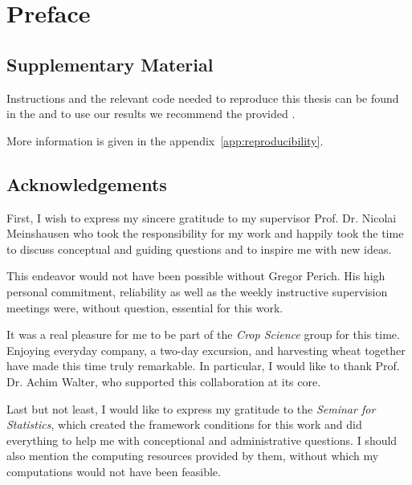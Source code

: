 \chapter*{Preface}

\section*{Supplementary Material}


Instructions and the relevant code needed to reproduce this thesis can be found in the \href{https://github.com/LGraz/MasterThesis-Code}{\color{blue}{GitHub repository}} and to use our results we recommend the provided \href{https://github.com/LGraz/CorrectTimeSeries }{\color{blue}{R-package}}.

More information is given in the appendix~\ref{app:reproducibility}.  


\section*{Acknowledgements}
First, I wish to express my sincere gratitude to my supervisor Prof. Dr. Nicolai Meinshausen who took the responsibility for my work and happily took the time to discuss conceptual and guiding questions and to inspire me with new ideas. 

This endeavor would not have been possible without Gregor Perich. His high personal commitment, reliability as well as the weekly instructive supervision meetings were, without question, essential for this work. 

It was a real pleasure for me to be part of the \textit{Crop Science} group for this time. Enjoying everyday company, a two-day excursion, and harvesting wheat together have made this time truly remarkable. In particular, I would like to thank Prof. Dr. Achim Walter, who supported this collaboration at its core.  

Last but not least, I would like to express my gratitude to the \textit{Seminar for Statistics}, which created the framework conditions for this work and did everything to help me with conceptional and administrative questions. I should also mention the computing resources provided by them, without which my computations would not have been feasible.

